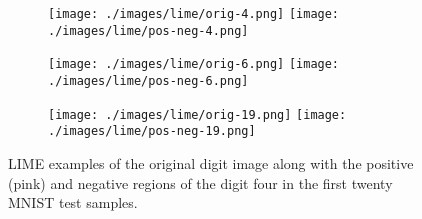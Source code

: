 \begin{figure}[H]
    \centering

    \begin{subfigure}{0.50\columnwidth}
        \centering
        \texttt{[image: ./images/lime/orig-4.png]}
        \texttt{[image: ./images/lime/pos-neg-4.png]}
        \caption{}
        \label{fig:lime_pos_neg_ex4}
    \end{subfigure}%
    \begin{subfigure}{0.50\columnwidth}
        \centering
        \texttt{[image: ./images/lime/orig-6.png]}
        \texttt{[image: ./images/lime/pos-neg-6.png]}
        \caption{}
        \label{fig:lime_pos_neg_ex6}
    \end{subfigure}

    \par\medskip

    \begin{subfigure}{0.50\columnwidth}
        \centering
        \texttt{[image: ./images/lime/orig-19.png]}
        \texttt{[image: ./images/lime/pos-neg-19.png]}
        \caption{}
        \label{fig:lime_pos_neg_ex19}
    \end{subfigure}

    \caption{LIME examples of the original digit image along with the positive (pink) and negative regions of the digit four in the first twenty MNIST test samples.}
    \label{fig:lime_pos_neg_four_test}
\end{figure}




    
